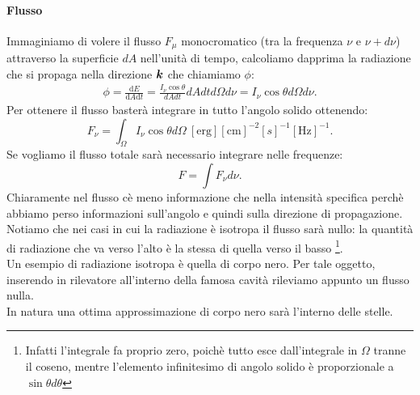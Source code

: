 \paragraph{Flusso}%
Immaginiamo di volere il flusso  $F_{\mu}$ monocromatico (tra la frequenza $\nu$ e $\nu + d\nu$) attraverso la superficie $dA$ nell'unità di tempo, calcoliamo dapprima la radiazione che si propaga nella direzione $\boldsymbol{k}$ che chiamiamo $\phi$:
\begin{align}
	\phi = \frac{\mbox{d} E}{\mbox{d} A \text{d}t} = \frac{I_{\nu}\cos\theta}{dA dt} dA dt d\Omega d\nu = I_{\nu} \cos\theta d\Omega d\nu
.\end{align}
Per ottenere il flusso basterà integrare in tutto l'angolo solido ottenendo:
\[
	F_{\nu} = \int_{\Omega} I_{\nu}\cos\theta d\Omega \ \left[ \text{erg} \right]  \left[ \text{cm} \right]^{-2} \left[ s \right]^{-1} \left[ \text{Hz} \right]^{-1} 
.\] 
Se vogliamo il flusso totale sarà necessario integrare nelle frequenze:
\[
	F = \int F_{\nu} d\nu
.\] 
Chiaramente nel flusso cè meno informazione che nella intensità specifica perchè abbiamo perso informazioni sull'angolo e quindi sulla direzione di propagazione.\\
Notiamo che nei casi in cui la radiazione è isotropa il flusso sarà nullo: la quantità di radiazione che va verso l'alto è la stessa di quella verso il basso \footnote{Infatti l'integrale fa proprio zero, poichè tutto esce dall'integrale in $\Omega$ tranne il coseno, mentre l'elemento infinitesimo di angolo solido è proporzionale a $\sin\theta d\theta$}.\\
Un esempio di radiazione isotropa è quella di corpo nero. Per tale oggetto, inserendo in rilevatore all'interno della famosa cavità rileviamo appunto un flusso nulla.\\
In natura una ottima approssimazione di corpo nero sarà l'interno delle stelle.\\
